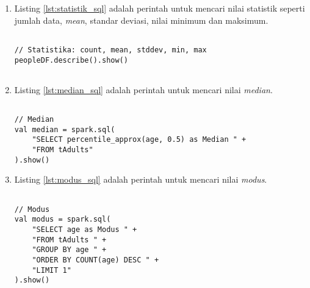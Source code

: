 \begin{enumerate}
\item Listing \ref{lst:statistik_sql} adalah perintah untuk mencari nilai statistik seperti jumlah data, \textit{mean}, standar deviasi, nilai minimum dan maksimum.
\begin{lstlisting}[basicstyle=\ttfamily, frame=single,
	columns=fullflexible, keepspaces=true, breaklines=true, label=lst:statistik_sql, caption=Mencari Nilai Statistik]
	
// Statistika: count, mean, stddev, min, max
peopleDF.describe().show()
    
\end{lstlisting}

\item Listing \ref{lst:median_sql} adalah perintah untuk mencari nilai \textit{median}.
\begin{lstlisting}[basicstyle=\ttfamily, frame=single,
	columns=fullflexible, keepspaces=true, breaklines=true, label=lst:median_sql, caption=Mencari Nilai Median]
	
// Median
val median = spark.sql(
	"SELECT percentile_approx(age, 0.5) as Median " +
	"FROM tAdults"
).show()

\end{lstlisting}

\newpage
\item Listing \ref{lst:modus_sql} adalah perintah untuk mencari nilai \textit{modus}.
\begin{lstlisting}[basicstyle=\ttfamily, frame=single,
	columns=fullflexible, keepspaces=true, breaklines=true, label=lst:modus_sql, caption=Mencari Nilai Modus]
	
// Modus
val modus = spark.sql( 
 	"SELECT age as Modus " +
	"FROM tAdults " +
	"GROUP BY age " +
	"ORDER BY COUNT(age) DESC " +
	"LIMIT 1"
).show()

\end{lstlisting}

\end{enumerate}


